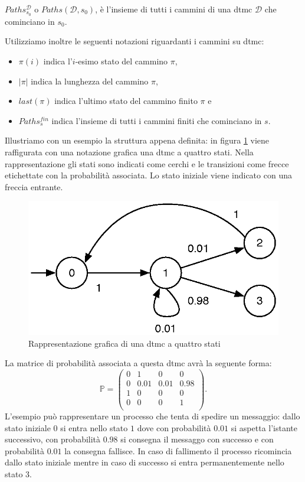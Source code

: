 \begin{mtdef}
	$Paths_{s_0}^{\mathcal{D}}$ o $Paths(\mathcal{D}, s_0)$, è l'insieme di tutti i cammini di una \ac{dtmc} $\mathcal{D}$ che cominciano in $s_0$.
\end{mtdef}

Utilizziamo inoltre le seguenti notazioni riguardanti i cammini su \ac{dtmc}:
\begin{itemize}
	\item $\pi(i)$ indica l'$i$-esimo stato del cammino $\pi$,
	\item $|\pi|$ indica la lunghezza del cammino $\pi$,
	\item $last(\pi)$ indica l'ultimo stato del cammino finito $\pi$ e
	\item $Paths^{fin}_s$ indica l'insieme di tutti i cammini finiti che cominciano in $s$.
\end{itemize}

Illustriamo con un esempio la struttura appena definita: in figura \ref{fig:dtmc:esempio} viene raffigurata con una notazione grafica una \ac{dtmc} a quattro stati. Nella rappresentazione gli stati sono indicati come cerchi e le transizioni come frecce etichettate con la probabilità associata. Lo stato iniziale viene indicato con una freccia entrante.
\begin{figure}[htb]
	\begin{center}
		\includegraphics[width=.5\textwidth]{Images/exdtmc}
	\end{center}
	\caption{Rappresentazione grafica di una \acs{dtmc} a quattro stati}
	\label{fig:dtmc:esempio}
\end{figure}
La matrice di probabilità associata a questa \ac{dtmc} avrà la seguente forma:
$$
\mathbb{P} = 
\left(
\begin{array}{cccc}
	0&1&0&0 \\
	0&0.01&0.01&0.98 \\
	1&0&0&0 \\
	0&0&0&1 \\
\end{array}
\right)
.
$$
L'esempio può rappresentare un processo che tenta di spedire un messaggio: dallo stato iniziale $0$ si entra nello stato $1$ dove con probabilità $0.01$ si aspetta l'istante successivo, con probabilità $0.98$ si consegna il messaggo con successo e con probabilità $0.01$ la consegna fallisce. In caso di fallimento il processo ricomincia dallo stato iniziale mentre in caso di successo si entra permanentemente nello stato $3$.

